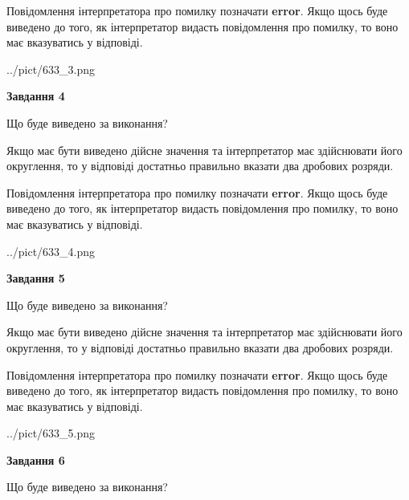 \documentclass[12pt, ukrainian]{article}
\begin{document}
{\begin {Large}
Повідомлення інтерпретатора про помилку позначати \textbf{error}.
Якщо щось буде виведено до того, як інтерпретатор видасть повідомлення про помилку, 
то воно має вказуватись у відповіді. \par

\begin{center}
	{../pict/633_3.png}
\end{center}
\newpage

{\begin {center}\textbf{Завдання 4}\end {center}}\par
Що буде виведено за виконання? \par

Якщо має бути виведено дійсне значення та інтерпретатор має здійснювати його округлення, 
то у відповіді достатньо правильно вказати два дробових розряди.

Повідомлення інтерпретатора про помилку позначати \textbf{error}.
Якщо щось буде виведено до того, як інтерпретатор видасть повідомлення про помилку, 
то воно має вказуватись у відповіді. \par

\begin{center}
	{../pict/633_4.png}
\end{center}
\newpage

{\begin {center}\textbf{Завдання 5}\end {center}}\par
Що буде виведено за виконання? \par

Якщо має бути виведено дійсне значення та інтерпретатор має здійснювати його округлення, 
то у відповіді достатньо правильно вказати два дробових розряди.

Повідомлення інтерпретатора про помилку позначати \textbf{error}.
Якщо щось буде виведено до того, як інтерпретатор видасть повідомлення про помилку, 
то воно має вказуватись у відповіді. \par

\begin{center}
	{../pict/633_5.png}
\end{center}
\newpage

{\begin {center}\textbf{Завдання 6}\end {center}}\par
Що буде виведено за виконання? \par


\end{Large}}
\end{document}
